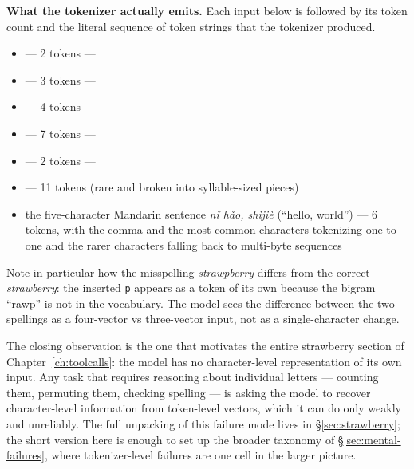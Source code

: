\begin{examplebox}
\small
\textbf{What the tokenizer actually emits.} Each input below is
followed by its token count and the literal sequence of token
strings that the tokenizer produced.

\begin{itemize}[leftmargin=1.5em,itemsep=0.1em]
\item {} --- 2 tokens --- 
\item {} --- 3 tokens --- 
\item {} --- 4 tokens --- 
\item {} --- 7 tokens --- 
\item {} --- 2 tokens --- 
\item {} --- 11 tokens (rare and broken into syllable-sized pieces)
\item the five-character Mandarin sentence \emph{n\v{i} h\v{a}o,
  sh\`{i}ji\`{e}} (``hello, world'') --- 6 tokens, with the
  comma and the most common characters tokenizing one-to-one and
  the rarer characters falling back to multi-byte sequences
\end{itemize}

\noindent
Note in particular how the misspelling \emph{strawpberry} differs
from the correct \emph{strawberry}: the inserted \texttt{p}
appears as a token of its own because the bigram ``rawp'' is not
in the vocabulary. The model sees the difference between the two
spellings as a four-vector vs three-vector input, not as a
single-character change.
\end{examplebox}

\noindent
The closing observation is the one that motivates the entire
strawberry section of Chapter~\ref{ch:toolcalls}: the model has
no character-level representation of its own input. Any task that
requires reasoning about individual letters --- counting them,
permuting them, checking spelling --- is asking the model to
recover character-level information from token-level vectors,
which it can do only weakly and unreliably. The full unpacking
of this failure mode lives in \S\ref{sec:strawberry}; the short
version here is enough to set up the broader taxonomy of
\S\ref{sec:mental-failures}, where tokenizer-level failures are
one cell in the larger picture.

